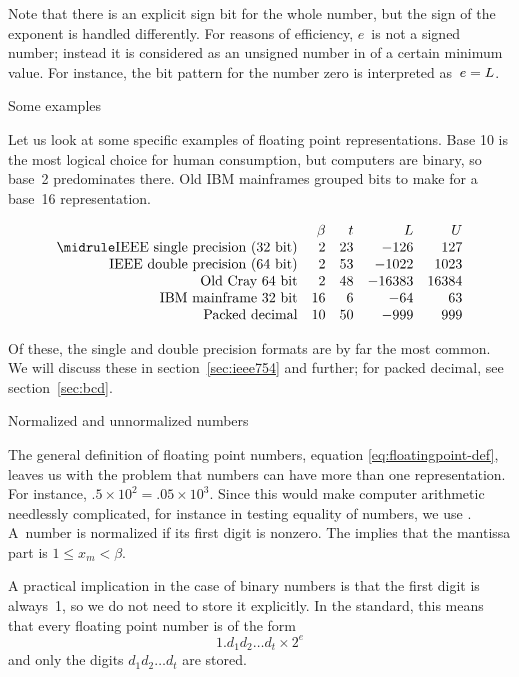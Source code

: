 Note that there is an explicit sign bit for the whole number, but the sign
of the exponent is handled differently. 
For reasons of efficiency, $e$~is not a signed number; instead it is
considered as an unsigned number in  of a certain minimum
value. For instance, the bit pattern for the number zero is
interpreted as~$e=\nobreak L$.

 {Some examples}

Let us look at some specific examples of floating point
representations. Base 10 is the most logical choice for human
consumption, but computers are binary, so base~2 predominates
there. Old IBM mainframes grouped bits to make for a base~16
representation.

\begin{equation}
\begin{array}{rrrrr}
  &\beta&t&L&U\\ \midrule
  \hbox{IEEE single precision (32 bit)}&2&23&-126&127\\
  \hbox{IEEE double precision (64 bit)}&2&53&-1022&1023\\
  \hbox{Old Cray 64 bit}&2&48&-16383&16384\\
  \hbox{IBM mainframe 32 bit}&16&6&-64&63\\
  \hbox{Packed decimal}&10&50&-999&999\\
\end{array}
\end{equation}

Of these, the single and double precision formats are by far the most
common. We will discuss these in section~\ref{sec:ieee754} and
further; for packed decimal, see section~\ref{sec:bcd}.


 {Normalized and unnormalized numbers}
\label{sec:normal-unnormal}

The general definition of floating point numbers,
equation \eqref{eq:floatingpoint-def}, leaves us with the problem that numbers
can have more than one representation. For instance,
$.5\times10^{2}=.05\times 10^3$. Since this would make computer
arithmetic needlessly complicated, for instance in testing equality of
numbers, we use . A~number is normalized if its first digit is nonzero.
The implies that the mantissa part is $1\leq x_m <\beta$.

A practical implication in the case of binary numbers is that the
first digit is always~1, so we do not need to store it explicitly.
In the  standard, this means that every floating point number
is of the form
\begin{equation}
  1.d_1d_2\ldots d_t\times 2^e
\end{equation}
and only the digits $d_1d_2\ldots d_t$ are stored.

